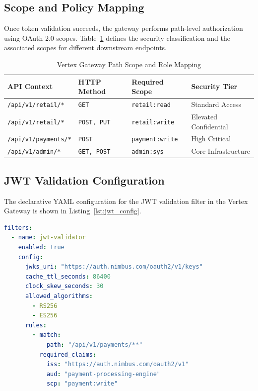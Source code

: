 \subsection{Scope and Policy Mapping}
Once token validation succeeds, the gateway performs path-level authorization using OAuth 2.0 scopes. Table~\ref{tab:scope_mapping} defines the security classification and the associated scopes for different downstream endpoints.

\begin{table}[htbp]
\centering
\caption{Vertex Gateway Path Scope and Role Mapping}
\label{tab:scope_mapping}
\begin{tabularx}{\textwidth}{l l l X}
\toprule
\textbf{API Context} & \textbf{HTTP Method} & \textbf{Required Scope} & \textbf{Security Tier} \\
\midrule
\texttt{/api/v1/retail/*} & \texttt{GET} & \texttt{retail:read} & Standard Access \\
\texttt{/api/v1/retail/*} & \texttt{POST, PUT} & \texttt{retail:write} & Elevated Confidential \\
\texttt{/api/v1/payments/*} & \texttt{POST} & \texttt{payment:write} & High Critical \\
\texttt{/api/v1/admin/*} & \texttt{GET, POST} & \texttt{admin:sys} & Core Infrastructure \\
\bottomrule
\end{tabularx}
\end{table}

\subsection{JWT Validation Configuration}
The declarative YAML configuration for the JWT validation filter in the Vertex Gateway is shown in Listing~\ref{lst:jwt_config}.

\begin{lstlisting}[language=yaml, caption={YAML configuration snippet for Vertex Gateway JWT validation filter.}, label={lst:jwt_config}]
filters:
  - name: jwt-validator
    enabled: true
    config:
      jwks_uri: "https://auth.nimbus.com/oauth2/v1/keys"
      cache_ttl_seconds: 86400
      clock_skew_seconds: 30
      allowed_algorithms:
        - RS256
        - ES256
      rules:
        - match:
            path: "/api/v1/payments/**"
          required_claims:
            iss: "https://auth.nimbus.com/oauth2/v1"
            aud: "payment-processing-engine"
            scp: "payment:write"
\end{lstlisting}
